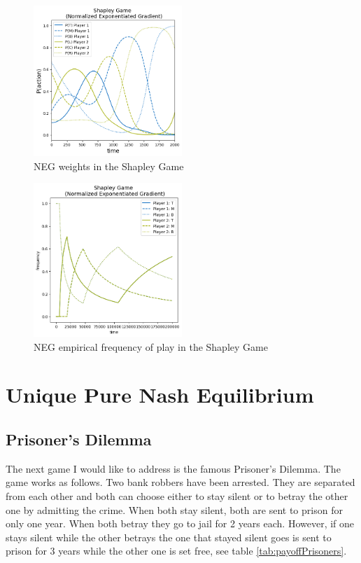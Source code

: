 \begin{figure}[H]
    \centering
    \includegraphics[width=0.5\textwidth]{logos/Shapley1.png}
    \caption{NEG weights in the Shapley Game}
    \label{fig:Shapley1}
\end{figure}

\begin{figure}[H]
    \centering
    \includegraphics[width=0.5\textwidth]{logos/Shapley2.png}
    \caption{NEG empirical frequency of play in the Shapley Game}
    \label{fig:Shapley2}
\end{figure}



\section{Unique Pure Nash Equilibrium}\label{section:uniquePureNashEquilibrium}

\subsection{Prisoner's Dilemma}\label{subsection:prisonersDilemma}

The next game I would like to address is the famous Prisoner's Dilemma. The game works as follows. Two bank robbers have been arrested. They are separated from each other and both can choose either to stay silent or to betray the other one by admitting the crime. When both stay silent, both are sent to prison for only one year. When both betray they go to jail for 2 years each. However, if one stays silent while the other betrays the one that stayed silent goes is sent to prison for 3 years while the other one is set free, see table \ref{tab:payoffPrisoners}.

